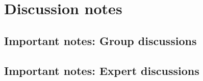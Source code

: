 \chapter{Discussion notes}
\label{appendix2-discussion-notes}

\section*{Important notes: Group discussions}

\section*{Important notes: Expert discussions}
